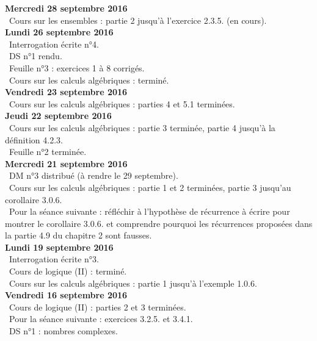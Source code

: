 \documentclass[12pt,a4paper]{article}
\begin{document}
\noindent\textbf{Mercredi 28 septembre 2016}\\
\bu\ Cours sur les ensembles : partie 2 jusqu'à l'exercice 2.3.5. (en cours).\vspace{.4cm}\\


\noindent\textbf{Lundi 26 septembre 2016}\\
\bu\ Interrogation écrite n°4.\\
\bu\ DS n°1 rendu. \\
\bu\ Feuille n°3 : exercices 1 à 8 corrigés. \\
\bu\ Cours sur les calculs algébriques : terminé.\vspace{.4cm}\\

\noindent\textbf{Vendredi 23 septembre 2016}\\
\bu\ Cours sur les calculs algébriques : parties 4  et 5.1 terminées.\vspace{.4cm}\\

\noindent\textbf{Jeudi 22 septembre 2016}\\
\bu\ Cours sur les calculs algébriques : partie 3 terminée, partie 4 jusqu'à la définition 4.2.3.\\
\bu\ Feuille n°2 terminée. \vspace{.4cm}\\

\noindent\textbf{Mercredi 21 septembre 2016}\\
\bu\ DM n°3 distribué (à rendre le 29 septembre). \\
\bu\ Cours sur les calculs algébriques : partie 1 et 2 terminées, partie 3 jusqu'au corollaire 3.0.6.\\
\bu\ Pour la séance suivante : réfléchir à l'hypothèse de récurrence à écrire pour montrer le corollaire 3.0.6. et comprendre pourquoi les récurrences proposées dans la partie 4.9 du chapitre 2 sont fausses. \vspace{.4cm}\\

\noindent\textbf{Lundi 19 septembre 2016}\\
\bu\ Interrogation écrite n°3.\\
\bu\ Cours de logique (II) : terminé.\\
\bu\ Cours sur les calculs algébriques : partie 1 jusqu'à l'exemple 1.0.6.\vspace{.4cm}\\

\noindent\textbf{Vendredi 16 septembre 2016}\\
\bu\ Cours de logique (II) : parties 2 et 3 terminées.\\
\bu\ Pour la séance suivante : exercices 3.2.5. et 3.4.1.\\
\bu\ DS n°1 : nombres complexes.\vspace{.4cm}\\
\end{document}
